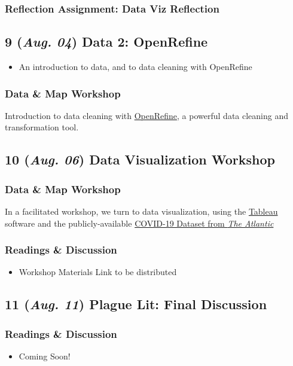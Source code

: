\documentclass[11pt]{article}
\begin{document}
\subsubsection*{Reflection Assignment: Data Viz Reflection}
\label{sec:orgb397e61}

\subsection*{9 (\textit{Aug. 04}) Data 2: OpenRefine}
\label{sec:orga7d92ba}
\begin{itemize}
\item An introduction to data, and to data cleaning with OpenRefine
\end{itemize}
\subsubsection*{Data \& Map Workshop}
\label{sec:org5e29e42}
Introduction to data cleaning with \href{http://openrefine.org/}{OpenRefine}, a powerful data cleaning and transformation tool. 
\subsection*{10 (\textit{Aug. 06}) Data Visualization Workshop}
\label{sec:org0b3e951}
\subsubsection*{Data \& Map Workshop}
\label{sec:orge6ccf70}
In a facilitated workshop, we turn to data visualization, using the  \href{https://www.tableau.com/}{Tableau} software and the publicly-available \href{https://covidtracking.com/data/api}{COVID-19 Dataset from \emph{The Atlantic}}

\subsubsection*{Readings \& Discussion}
\label{sec:orge481ebd}
\begin{itemize}
\item Workshop Materials Link to be distributed
\end{itemize}
\subsection*{11 (\textit{Aug. 11}) Plague Lit: Final Discussion}
\label{sec:org00ec805}
\subsubsection*{Readings \& Discussion}
\label{sec:org905b3ec}
\begin{itemize}
\item Coming Soon!
\end{itemize}
\end{document}
